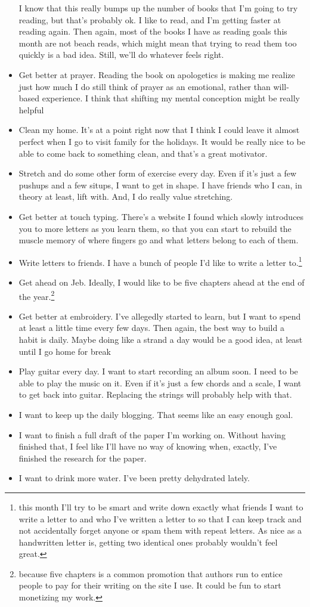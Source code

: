 \documentclass[12pt]{article}[titlepage]
\renewcommand{\,}{\textsuperscript{,}}
\begin{document}
\begin{itemize}
I know that this really bumps up the number of books that I'm going to try reading, but that's probably ok. I like to read, and I'm getting faster at reading again.
Then again, most of the books I have as reading goals this month are not beach reads, which might mean that trying to read them too quickly is a bad idea.
Still, we'll do whatever feels right.
\item Get better at prayer. Reading the book on apologetics is making me realize just how much I do still think of prayer as an emotional, rather than will-based experience. I think that shifting my mental conception might be really helpful
\item Clean my home. It's at a point right now that I think I could leave it almost perfect when I go to visit family for the holidays.
It would be really nice to be able to come back to something clean, and that's a great motivator.
\item Stretch and do some other form of exercise every day.
Even if it's just a few pushups and a few situps, I want to get in shape. I have friends who I can, in theory at least, lift with.
And, I do really value stretching.
\item Get better at touch typing.
There's a website I found which slowly introduces you to more letters as you learn them, so that you can start to rebuild the muscle memory of where fingers go and what letters belong to each of them.
\item Write letters to friends.
I have a bunch of people I'd like to write a letter to.\footnote{this month I'll try to be smart and write down exactly what friends I want to write a letter to and who I've written a letter to so that I can keep track and not accidentally forget anyone or spam them with repeat letters.
As nice as a handwritten letter is, getting two identical ones probably wouldn't feel great.}
\item Get ahead on Jeb. Ideally, I would like to be five chapters ahead at the end of the year.\footnote{because five chapters is a common promotion that authors run to entice people to pay for their writing on the site I use. It could be fun to start monetizing my work.}
\item Get better at embroidery.
I've allegedly started to learn, but I want to spend at least a little time every few days.
Then again, the best way to build a habit is daily.
Maybe doing like a strand a day would be a good idea, at least until I go home for break 
\item Play guitar every day.
I want to start recording an album soon.
I need to be able to play the music on it.
Even if it's just a few chords and a scale, I want to get back into guitar.
Replacing the strings will probably help with that.
\item I want to keep up the daily blogging. That seems like an easy enough goal.
\item I want to finish a full draft of the paper I'm working on. Without having finished that, I feel like I'll have no way of knowing when, exactly, I've finished the research for the paper.
\item I want to drink more water. I've been pretty dehydrated lately. 
\end{itemize} 
 
\end{document}
